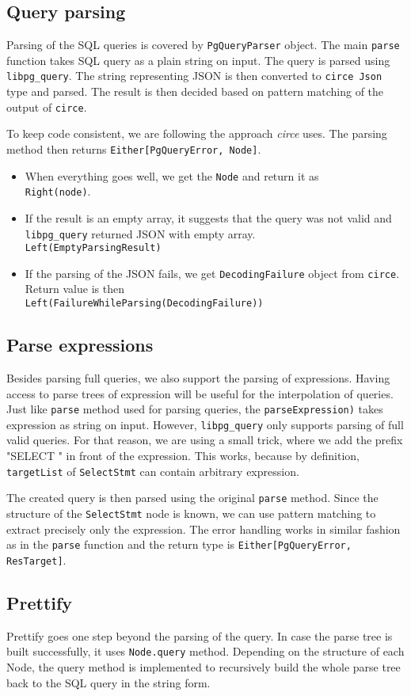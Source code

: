 \subsection{Query parsing}
Parsing of the SQL queries is covered by \texttt{PgQueryParser} object. The main \texttt{parse} function takes SQL query as a plain string on input. The query is parsed using \texttt{libpg\_query}. The string representing JSON is then converted to \texttt{circe Json} type and parsed. The result is then decided based on pattern matching of the output of \texttt{circe}. 

To keep code consistent, we are following the approach \textit{circe} uses. The parsing method then returns \texttt{Either[PgQueryError, Node]}.
\begin{itemize}
    \item When everything goes well, we get the \texttt{Node} and return it as \\ \texttt{Right(node)}.
    \item If the result is an empty array, it suggests that the query was not valid and \texttt{libpg\_query} returned JSON with empty array. \\
    \texttt{Left(EmptyParsingResult)}
    \item If the parsing of the JSON fails, we get \texttt{DecodingFailure} object from \texttt{circe}. Return value is then \\ \texttt{Left(FailureWhileParsing(DecodingFailure))}
\end{itemize}

\subsection{Parse expressions}
Besides parsing full queries, we also support the parsing of expressions. Having access to parse trees of expression will be useful for the interpolation of queries. Just like \texttt{parse} method used for parsing queries, the \texttt{parseExpression)} takes expression as string on input. However, \texttt{libpg\_query} only supports parsing of full valid queries. For that reason, we are using a small trick, where we add the prefix "SELECT " in front of the expression. This works, because by definition, \texttt{targetList} of \texttt{SelectStmt} can contain arbitrary expression.

The created query is then parsed using the original \texttt{parse} method. Since the structure of the \texttt{SelectStmt} node is known, we can use pattern matching to extract precisely only the expression. The error handling works in similar fashion as in the \texttt{parse} function and the return type is \texttt{Either[PgQueryError, ResTarget]}.

\subsection{Prettify}
Prettify goes one step beyond the parsing of the query. In case the parse tree is built successfully, it uses \texttt{Node.query} method. Depending on the structure of each Node, the query method is implemented to recursively build the whole parse tree back to the SQL query in the string form.


